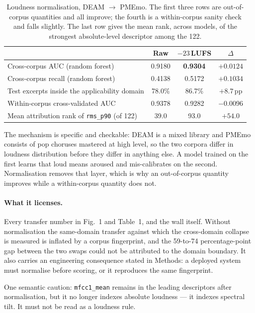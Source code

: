 \begin{table}[htbp]
\centering\small
\caption{Loudness normalisation, DEAM $\rightarrow$ PMEmo. The first three rows are
out-of-corpus quantities and all improve; the fourth is a within-corpus sanity check
and falls slightly. The last row gives the mean rank, across models, of the strongest
absolute-level descriptor among the 122.}
\begin{tabular}{lccc}
\toprule
 & Raw & $-23$\,LUFS & $\Delta$ \\
\midrule
Cross-corpus AUC (random forest)      & 0.9180 & \textbf{0.9304} & $+0.0124$ \\
Cross-corpus recall (random forest)   & 0.4138 & 0.5172 & $+0.1034$ \\
Test excerpts inside the applicability domain & 78.0\% & 86.7\% & $+8.7$\,pp \\
Within-corpus cross-validated AUC     & 0.9378 & 0.9282 & $-0.0096$ \\
Mean attribution rank of \texttt{rms\_p90} (of 122) & 39.0 & 93.0 & $+54.0$ \\
\bottomrule
\end{tabular}
\end{table}

The mechanism is specific and checkable: DEAM is a mixed library and PMEmo consists of
pop choruses mastered at high level, so the two corpora differ in loudness
distribution before they differ in anything else. A model trained on the first learns
that loud means aroused and mis-calibrates on the second. Normalisation removes that
layer, which is why an out-of-corpus quantity improves while a within-corpus quantity
does not.

\paragraph{What it licenses.}
Every transfer number in Fig.~1 and Table~1, and the wall itself. Without
normalisation the same-domain transfer against which the cross-domain collapse is
measured is inflated by a corpus fingerprint, and the 59-to-74 percentage-point gap
between the two swaps could not be attributed to the domain boundary. It also carries
an engineering consequence stated in Methods: a deployed system must normalise before
scoring, or it reproduces the same fingerprint.

One semantic caution: \texttt{mfcc1\_mean} remains in the leading descriptors after
normalisation, but it no longer indexes absolute loudness --- it indexes spectral
tilt. It must not be read as a loudness rule.

